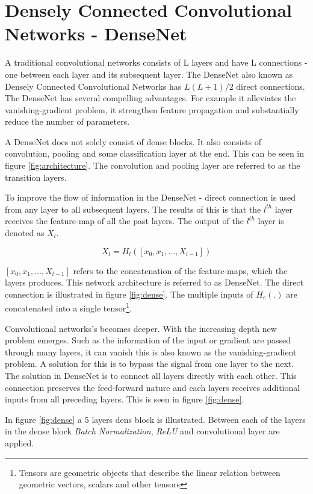\section{Densely Connected Convolutional Networks - DenseNet}

A traditional convolutional networks consists of L layers and have L connections - one between each layer and its subsequent layer. The DenseNet also known as Densely Connected Convolutional Networks has $L(L+1)/2$ direct connections. The DenseNet has several compelling advantages. For example it alleviates the vanishing-gradient problem, it strengthen feature propagation and substantially reduce the number of parameters.

A DenseNet does not solely consist of dense blocks. It also consists of convolution, pooling and some classification layer at the end. This can be seen in figure \ref{fig:architecture}. The convolution and pooling layer are referred to as the transition layers.


To improve the flow of information in the DenseNet - direct connection is used from any layer to all subsequent layers. The results of this is that the $l^{th}$ layer receives the feature-map of all the past layers. The output of the $l^{th}$ layer is denoted as $X_l$.

\begin{equation}
X_l=H_l([x_0,x_1,...,X_{l-1}])
\end{equation}

$[x_0,x_1,...,X_{l-1}]$ refers to the concatenation of the feature-maps, which the layers produces. This network architecture is referred to as DenseNet. The direct connection is illustrated in figure \ref{fig:dense}. The multiple inputs of $H_e(.)$ are concatenated into a single tensor\footnote{Tensors are geometric objects that describe the linear relation between geometric vectors, scalars and other tensors}.

Convolutional networks's becomes deeper. With the increasing depth new problem emerges. Such as the information of the input or gradient are passed through many layers, it can vanish this is also known as the vanishing-gradient problem. A solution for this is to bypass the signal from one layer to the next. The solution in DenseNet is to connect all layers directly with each other. This connection preserves the feed-forward nature and each layers receives additional inputs from all preceding layers. This is seen in figure \ref{fig:dense}.


In figure \ref{fig:dense} a 5 layers dens block is illustrated. Between each of the layers in the dense block \emph{Batch Normalization}, \emph{ReLU} and convolutional layer are applied.